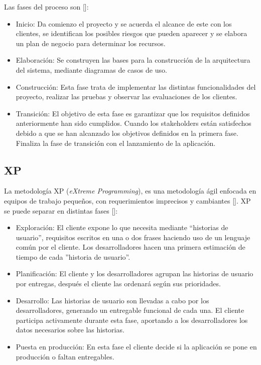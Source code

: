 Las fases del proceso son [\cite{92}]:
\begin{itemize}
\item Inicio: Da comienzo el proyecto y se acuerda el alcance de este con los clientes, se identifican los posibles riesgos que pueden aparecer y se elabora un plan de negocio para determinar los recursos.
\item Elaboración: Se construyen las bases para la construcción de la arquitectura del sistema, mediante diagramas de casos de uso.
\item Construcción: Esta fase trata de implementar las distintas funcionalidades del proyecto, realizar las pruebas y observar las evaluaciones de los clientes.
\item Transición: El objetivo de esta fase es garantizar que los requisitos definidos anteriormente han sido cumplidos. Cuando los stakeholders están satisfechos debido a que se han alcanzado los objetivos definidos en la primera fase. Finaliza la fase de transición con el lanzamiento de la aplicación.
\end{itemize}

\subsection{XP}
La metodología XP (\textit{eXtreme Programming}), es una metodología ágil enfocada en equipos de trabajo pequeños, con requerimientos imprecisos y cambiantes [\cite{93}]. XP se puede separar en distintas fases [\cite{92}]:
\begin{itemize}
\item Exploración: El cliente expone lo que necesita mediante ``historias de usuario'', requisitos escritos en una o dos frases haciendo uso de un lenguaje común por el cliente. Los desarrolladores hacen una primera estimación de tiempo de cada ''historia de usuario''.
\item Planificación: El cliente y los desarrolladores agrupan las historias de usuario por entregas, después el cliente las ordenará según sus prioridades.
\item Desarrollo: Las historias de usuario son llevadas a cabo por los desarrolladores, generando un entregable funcional de cada una. El cliente participa activamente durante esta fase, aportando a los desarrolladores los datos necesarios sobre las historias.
\item Puesta en producción: En esta fase el cliente decide si la aplicación se pone en producción o faltan entregables.
\end{itemize}

